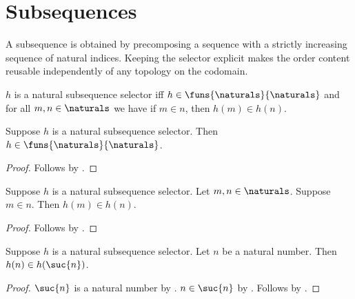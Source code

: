 \section{Subsequences}



A subsequence is obtained by precomposing a sequence with a strictly
increasing sequence of natural indices.  Keeping the selector explicit makes
the order content reusable independently of any topology on the codomain.

\begin{definition}\label{natural_subsequence_selector}
    $h$ is a natural subsequence selector iff
        $h\in\funs{\naturals}{\naturals}$ and for all
        $m,n\in\naturals$ we have if $m\in n$, then $h(m)\in h(n)$.
\end{definition}

\begin{proposition}\label{natural_subsequence_selector_type}
    Suppose $h$ is a natural subsequence selector.
    Then $h\in\funs{\naturals}{\naturals}$.
\end{proposition}
\begin{proof}
    Follows by .
\end{proof}

\begin{proposition}\label{natural_subsequence_selector_strict}
    Suppose $h$ is a natural subsequence selector.
    Let $m,n\in\naturals$.
    Suppose $m\in n$.
    Then $h(m)\in h(n)$.
\end{proposition}
\begin{proof}
    Follows by .
\end{proof}

\begin{proposition}\label{natural_subsequence_selector_successor}
    Suppose $h$ is a natural subsequence selector.
    Let $n$ be a natural number.
    Then $h(n)\in h(\suc{n})$.
\end{proposition}
\begin{proof}
    $\suc{n}$ is a natural number by .
    $n\in\suc{n}$ by .
    Follows by .
\end{proof}

